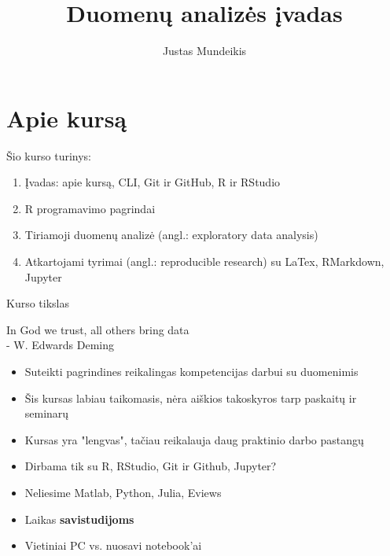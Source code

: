 \documentclass[11pt,xcolor=table]{beamer}
\author{Justas Mundeikis}
\title{Duomenų analizės įvadas}
\begin{document}
\section{Apie kursą}

\begin{frame}
\titlepage
\end{frame}
\begin{frame}{Šio kurso turinys:}
\begin{enumerate}
\item Įvadas: apie kursą, CLI,  Git ir GitHub, R ir RStudio
\item R programavimo pagrindai
\item Tiriamoji duomenų analizė (angl.: exploratory data analysis)
\item Atkartojami tyrimai (angl.: reproducible research) su LaTex, RMarkdown, Jupyter
\end{enumerate}
\end{frame}
\begin{frame}{Kurso tikslas}

{\Large In God we trust, all others bring data}\\ 
{\scriptsize - W. Edwards Deming }

\begin{itemize}
\item Suteikti pagrindines reikalingas kompetencijas darbui su duomenimis
\item Šis kursas labiau taikomasis, nėra aiškios takoskyros tarp paskaitų ir seminarų
\item Kursas yra "lengvas", tačiau reikalauja daug praktinio darbo pastangų
\item Dirbama tik su R, RStudio, Git ir Github, Jupyter?
\item Neliesime Matlab, Python, Julia, Eviews
\item Laikas \textbf{savistudijoms}
\item Vietiniai PC vs. nuosavi notebook'ai
\end{itemize}
\end{frame}
\end{document}
